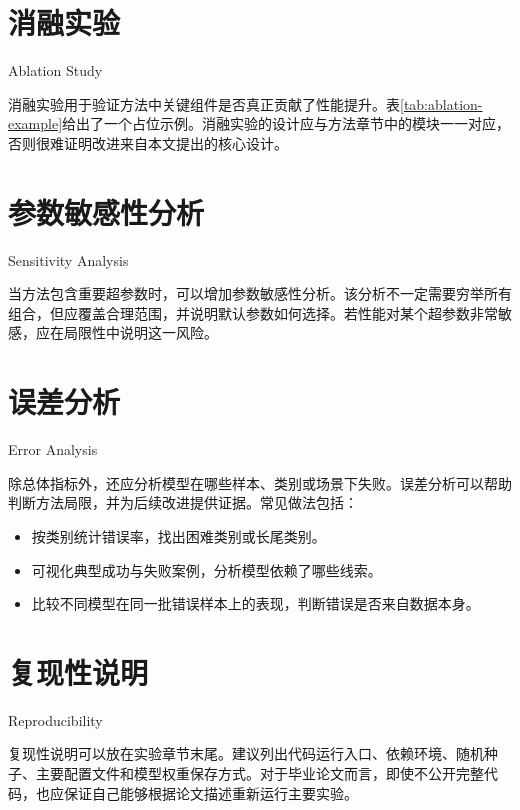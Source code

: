 \section{消融实验}{Ablation Study}

消融实验用于验证方法中关键组件是否真正贡献了性能提升。表\ref{tab:ablation-example}给出了一个占位示例。消融实验的设计应与方法章节中的模块一一对应，否则很难证明改进来自本文提出的核心设计。



\section{参数敏感性分析}{Sensitivity Analysis}

当方法包含重要超参数时，可以增加参数敏感性分析。该分析不一定需要穷举所有组合，但应覆盖合理范围，并说明默认参数如何选择。若性能对某个超参数非常敏感，应在局限性中说明这一风险。

\section{误差分析}{Error Analysis}

除总体指标外，还应分析模型在哪些样本、类别或场景下失败。误差分析可以帮助判断方法局限，并为后续改进提供证据。常见做法包括：

\begin{itemize}
    \item 按类别统计错误率，找出困难类别或长尾类别。
    \item 可视化典型成功与失败案例，分析模型依赖了哪些线索。
    \item 比较不同模型在同一批错误样本上的表现，判断错误是否来自数据本身。
\end{itemize}

\section{复现性说明}{Reproducibility}

复现性说明可以放在实验章节末尾。建议列出代码运行入口、依赖环境、随机种子、主要配置文件和模型权重保存方式。对于毕业论文而言，即使不公开完整代码，也应保证自己能够根据论文描述重新运行主要实验。
